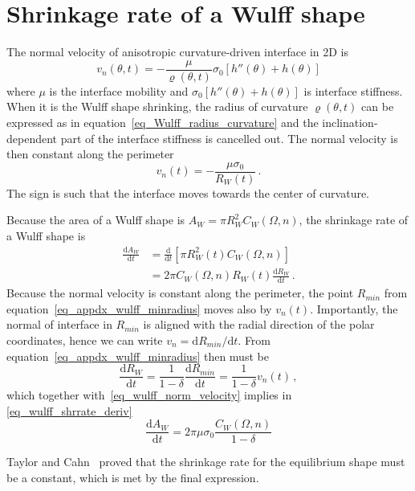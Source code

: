 \section{Shrinkage rate of a Wulff shape} \label{sec_appendix_wulff_shrrate}
The normal velocity of anisotropic curvature-driven interface in 2D is~\cite{Abdeljawad2018}
\begin{equation}
	v_n(\theta,t)=-\frac{\mu}{\varrho(\theta,t)}\sigma_0[h''(\theta) + h(\theta)] 
\end{equation}
where $\mu$ is the interface mobility and $\sigma_0[h''(\theta) + h(\theta)]$ is interface stiffness. When it is the
Wulff shape shrinking, the radius of curvature $\varrho(\theta,t)$ can be expressed as in equation~\eqref{eq_Wulff_radius_curvature} and the inclination-dependent part of the interface stiffness is cancelled out. The normal velocity is then constant along the perimeter
\begin{equation} \label{eq_wulff_norm_velocity}
	v_n(t) = - \frac{\mu \sigma_0}{R_W(t)} \,.
\end{equation}
The sign is such that the interface moves towards the center of curvature.

Because the area of a Wulff shape is $A_W=\pi R_W^2C_W(\Omega,n)$, the shrinkage rate of a Wulff shape is
\begin{equation}\label{eq_wulff_shrrate_deriv}
	\begin{split}
		\frac{\mathrm{d}A_W}{\mathrm{d}t} &= \frac{\mathrm{d}}{\mathrm{d}t}[\pi R_W^2(t)C_W(\Omega,n)]    \\
		&= 2\pi C_W(\Omega,n) R_W(t) \frac{\mathrm{d}R_W}{\mathrm{d}t} \,.
	\end{split}
\end{equation}
Because  the normal velocity is constant along the perimeter, the point $R_{min}$ from equation~\eqref{eq_appdx_wulff_minradius} moves also by $v_n(t)$. Importantly, the normal of interface in $R_{min}$ is aligned with the radial direction of the polar coordinates, hence we can write $v_n=\mathrm{d}R_{min}/\mathrm{d}t$. From equation~\eqref{eq_appdx_wulff_minradius} then must be
\begin{equation}
	\frac{\mathrm{d}R_{W}}{\mathrm{d}t}=\frac{1}{1-\delta}\frac{\mathrm{d}R_{min}}{\mathrm{d}t}=\frac{1}{1-\delta}v_n(t) \,,
\end{equation}
which together with~\ref{eq_wulff_norm_velocity} implies in \ref{eq_wulff_shrrate_deriv}
\begin{equation}
	\frac{\mathrm{d}A_W}{\mathrm{d}t} = 2\pi\mu\sigma_0  \frac{C_W(\Omega,n)}{1-\delta} 
\end{equation}

Taylor and Cahn~\cite{Taylor1998} proved that the shrinkage rate for the equilibrium shape must be a constant, which is met by the final expression.



\cleardoublepage

